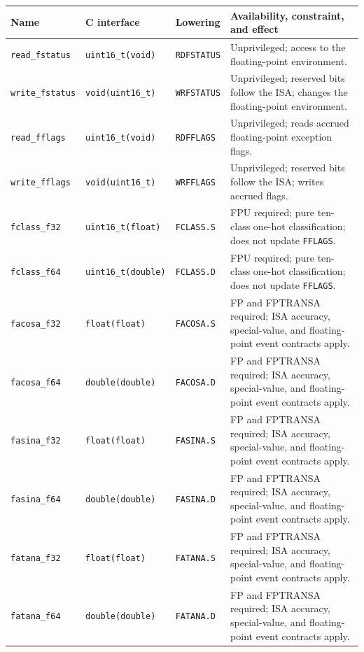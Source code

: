 \begingroup\footnotesize
\setlength{\tabcolsep}{2pt}
\begin{longtable}{@{}p{1.25in}p{1.3in}p{0.85in}p{2.2in}@{}}
\toprule
\textbf{Name} & \textbf{C interface} & \textbf{Lowering} & \textbf{Availability, constraint, and effect}\\
\midrule
\endhead
\texttt{read\_fstatus} & \texttt{uint16\_t(void)} & \texttt{RDFSTATUS} & Unprivileged; access to the floating-point environment.\\
\texttt{write\_fstatus} & \texttt{void(uint16\_t)} & \texttt{WRFSTATUS} & Unprivileged; reserved bits follow the ISA; changes the floating-point environment.\\
\texttt{read\_fflags} & \texttt{uint16\_t(void)} & \texttt{RDFFLAGS} & Unprivileged; reads accrued floating-point exception flags.\\
\texttt{write\_fflags} & \texttt{void(uint16\_t)} & \texttt{WRFFLAGS} & Unprivileged; reserved bits follow the ISA; writes accrued flags.\\
\texttt{fclass\_f32} & \texttt{uint16\_t(float)} & \texttt{FCLASS.S} & FPU required; pure ten-class one-hot classification; does not update \texttt{FFLAGS}.\\
\texttt{fclass\_f64} & \texttt{uint16\_t(double)} & \texttt{FCLASS.D} & FPU required; pure ten-class one-hot classification; does not update \texttt{FFLAGS}.\\
\texttt{facosa\_f32} & \texttt{float(float)} & \texttt{FACOSA.S} & FP and FPTRANSA required; ISA accuracy, special-value, and floating-point event contracts apply.\\
\texttt{facosa\_f64} & \texttt{double(double)} & \texttt{FACOSA.D} & FP and FPTRANSA required; ISA accuracy, special-value, and floating-point event contracts apply.\\
\texttt{fasina\_f32} & \texttt{float(float)} & \texttt{FASINA.S} & FP and FPTRANSA required; ISA accuracy, special-value, and floating-point event contracts apply.\\
\texttt{fasina\_f64} & \texttt{double(double)} & \texttt{FASINA.D} & FP and FPTRANSA required; ISA accuracy, special-value, and floating-point event contracts apply.\\
\texttt{fatana\_f32} & \texttt{float(float)} & \texttt{FATANA.S} & FP and FPTRANSA required; ISA accuracy, special-value, and floating-point event contracts apply.\\
\texttt{fatana\_f64} & \texttt{double(double)} & \texttt{FATANA.D} & FP and FPTRANSA required; ISA accuracy, special-value, and floating-point event contracts apply.\\

\end{longtable}
